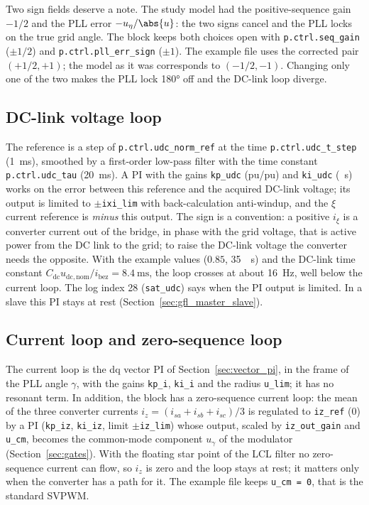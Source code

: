\documentclass[11pt,a4paper]{scrartcl}
\newcommand{\ped}[1]{_{\mathrm{#1}}}
\newcommand{\code}[1]{\texttt{#1}}
\begin{document}
\begin{onehalfspace}
Two sign fields deserve a note. The study model had the positive-sequence gain $-1/2$ and the PLL error $-u_\eta/\abs{u}$: the two signs cancel and the PLL locks on the true grid angle. The block keeps both choices open with \code{p.ctrl.seq\_gain} ($\pm 1/2$) and \code{p.ctrl.pll\_err\_sign} ($\pm 1$). The example file uses the corrected pair $(+1/2, +1)$; the model as it was corresponds to $(-1/2, -1)$. Changing only one of the two makes the PLL lock \ang{180} off and the DC-link loop diverge.

\subsection{DC-link voltage loop}
\label{sec:udc_loop}

The reference is a step of \code{p.ctrl.udc\_norm\_ref} at the time \code{p.ctrl.udc\_t\_step} (\SI{1}{\milli\second}), smoothed by a first-order low-pass filter with the time constant \code{p.ctrl.udc\_tau} (\SI{20}{\milli\second}). A PI with the gains \code{kp\_udc} (pu/pu) and \code{ki\_udc} (\si{\per\second}) works on the error between this reference and the acquired DC-link voltage; its output is limited to $\pm$\code{ixi\_lim} with back-calculation anti-windup, and the $\xi$ current reference is \emph{minus} this output. The sign is a convention: a positive $i_\xi$ is a converter current out of the bridge, in phase with the grid voltage, that is active power from the DC link to the grid; to raise the DC-link voltage the converter needs the opposite. With the example values ($0.85$, \SI{35}{\per\second}) and the DC-link time constant $C\ped{dc} u\ped{dc,nom}/i\ped{bez} = \SI{8.4}{\milli\second}$, the loop crosses at about \SI{16}{\hertz}, well below the current loop. The log index 28 (\code{sat\_udc}) says when the PI output is limited. In a slave this PI stays at rest (Section~\ref{sec:gfl_master_slave}).

\subsection{Current loop and zero-sequence loop}
\label{sec:gfl_current_loop}

The current loop is the dq vector PI of Section~\ref{sec:vector_pi}, in the frame of the PLL angle $\gamma$, with the gains \code{kp\_i}, \code{ki\_i} and the radius \code{u\_lim}; it has no resonant term. In addition, the block has a zero-sequence current loop: the mean of the three converter currents $i_z = (i_{sa} + i_{sb} + i_{sc})/3$ is regulated to \code{iz\_ref} (0) by a PI (\code{kp\_iz}, \code{ki\_iz}, limit $\pm$\code{iz\_lim}) whose output, scaled by \code{iz\_out\_gain} and \code{u\_cm}, becomes the common-mode component $u_\gamma$ of the modulator (Section~\ref{sec:gates}). With the floating star point of the LCL filter no zero-sequence current can flow, so $i_z$ is zero and the loop stays at rest; it matters only when the converter has a path for it. The example file keeps \code{u\_cm = 0}, that is the standard SVPWM.


\end{onehalfspace}
\end{document}
